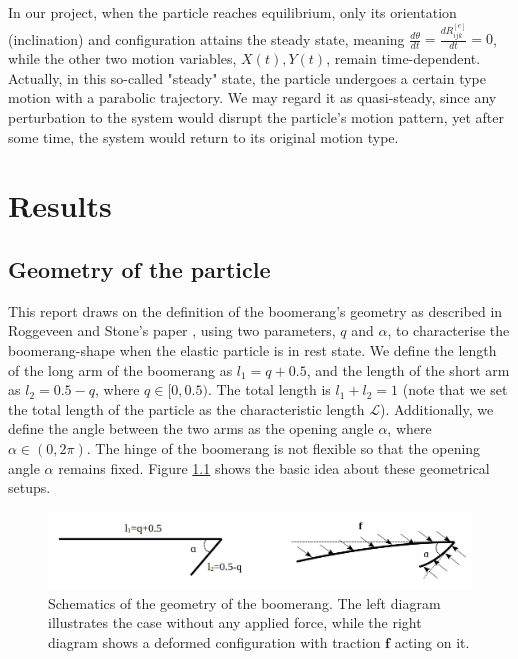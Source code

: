 \documentclass[a4paper,12pt]{report}
\begin{document}
 In our project, when the particle reaches equilibrium, only its orientation (inclination) and configuration attains the steady state, meaning  $\frac{d\theta}{dt}=\frac{dR_{ijk}^{[e]}}{dt}=0$, while the other two motion variables, $X(t), Y(t)$, remain time-dependent. Actually, in this so-called "steady" state, the particle undergoes a certain type motion with a parabolic trajectory. We may regard it as quasi-steady, since any perturbation to the system would disrupt the particle's motion pattern, yet after some time, the system would return to its original motion type. 
 
 \chapter{Results}
\section{Geometry of the particle}
This report draws on the definition of the boomerang's geometry as described in Roggeveen and Stone's paper \cite{roggeveen2022motion}, using two parameters, $q$ and $\alpha$, to characterise the boomerang-shape when the elastic particle is in rest state. We define the length of the long arm of the boomerang as $l_1=q+0.5$, and the length of the short arm as $l_2=0.5-q$, where $q \in [0,0.5)$. The total length is $l_1+l_2=1$ (note that we set the total length of the particle as the characteristic length $\mathcal{L}$). Additionally, we define the angle between the two arms as the opening angle $\alpha$, where $\alpha \in (0,2\pi)$. The hinge of the boomerang is not flexible so that the opening angle $\alpha$ remains fixed. Figure \ref{fig:1} shows the basic idea about these geometrical setups. 
\begin{figure}[htb]
	\begin{center}
		\includegraphics[width=1\textwidth]{plot/geometry.png}
		\caption{Schematics of the geometry of the boomerang. The left diagram illustrates the case without any applied force, while the right diagram shows a deformed configuration with traction $\mathbf{f}$ acting on it.}
		\label{fig:1}
	\end{center}
\end{figure}
\end{document}
